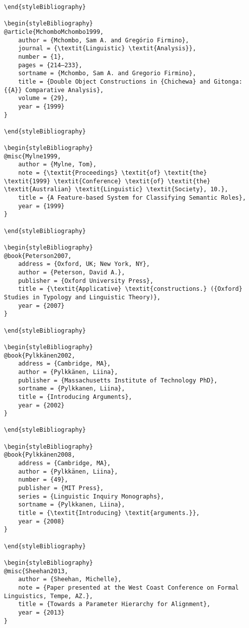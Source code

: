 \documentclass[output=paper,modfonts,nonflat]{langsci/langscibook}
\begin{document}
\begin{verbatim}
\end{styleBibliography}

\begin{styleBibliography}
@article{MchomboMchombo1999,
	author = {Mchombo, Sam A. and Gregório Firmino},
	journal = {\textit{Linguistic} \textit{Analysis}},
	number = {1},
	pages = {214–233},
	sortname = {Mchombo, Sam A. and Gregorio Firmino},
	title = {Double Object Constructions in {Chichewa} and Gitonga: {{A}} Comparative Analysis},
	volume = {29},
	year = {1999}
}

\end{styleBibliography}

\begin{styleBibliography}
@misc{Mylne1999,
	author = {Mylne, Tom},
	note = {\textit{Proceedings} \textit{of} \textit{the} \textit{1999} \textit{Conference} \textit{of} \textit{the} \textit{Australian} \textit{Linguistic} \textit{Society}, 10.},
	title = {A Feature-based System for Classifying Semantic Roles},
	year = {1999}
}

\end{styleBibliography}

\begin{styleBibliography}
@book{Peterson2007,
	address = {Oxford, UK; New York, NY},
	author = {Peterson, David A.},
	publisher = {Oxford University Press},
	title = {\textit{Applicative} \textit{constructions.} ({Oxford} Studies in Typology and Linguistic Theory)},
	year = {2007}
}

\end{styleBibliography}

\begin{styleBibliography}
@book{Pylkkänen2002,
	address = {Cambridge, MA},
	author = {Pylkkänen, Liina},
	publisher = {Massachusetts Institute of Technology PhD},
	sortname = {Pylkkanen, Liina},
	title = {Introducing Arguments},
	year = {2002}
}

\end{styleBibliography}

\begin{styleBibliography}
@book{Pylkkänen2008,
	address = {Cambridge, MA},
	author = {Pylkkänen, Liina},
	number = {49},
	publisher = {MIT Press},
	series = {Linguistic Inquiry Monographs},
	sortname = {Pylkkanen, Liina},
	title = {\textit{Introducing} \textit{arguments.}},
	year = {2008}
}

\end{styleBibliography}

\begin{styleBibliography}
@misc{Sheehan2013,
	author = {Sheehan, Michelle},
	note = {Paper presented at the West Coast Conference on Formal Linguistics, Tempe, AZ.},
	title = {Towards a Parameter Hierarchy for Alignment},
	year = {2013}
}


\end{verbatim}
\end{document}
